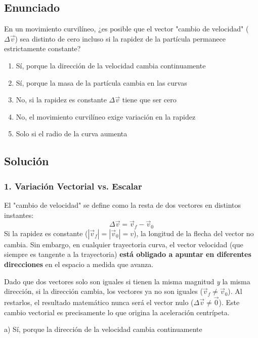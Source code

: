 \documentclass[12pt, a4paper]{article}
\begin{document}
\newpage

\subsection*{Enunciado}
En un movimiento curvilíneo, ¿es posible que el vector "cambio de velocidad" ($\Delta \vec{v}$) sea distinto de cero incluso si la rapidez de la partícula permanece estrictamente constante?
\begin{enumerate}[label=\alph*)]
    \item Sí, porque la dirección de la velocidad cambia continuamente
    \item Sí, porque la masa de la partícula cambia en las curvas
    \item No, si la rapidez es constante $\Delta \vec{v}$ tiene que ser cero
    \item No, el movimiento curvilíneo exige variación en la rapidez
    \item Solo si el radio de la curva aumenta
\end{enumerate}

\subsection*{Solución}

\subsubsection*{1. Variación Vectorial vs. Escalar}
El "cambio de velocidad" se define como la resta de dos vectores en distintos instantes:
$$ \Delta \vec{v} = \vec{v}_f - \vec{v}_0 $$
Si la rapidez es constante ($|\vec{v}_f| = |\vec{v}_0| = v$), la longitud de la flecha del vector no cambia. 
Sin embargo, en cualquier trayectoria curva, el vector velocidad (que siempre es tangente a la trayectoria) \textbf{está obligado a apuntar en diferentes direcciones} en el espacio a medida que avanza.

Dado que dos vectores solo son iguales si tienen la misma magnitud \textit{y} la misma dirección, si la dirección cambia, los vectores ya no son iguales ($\vec{v}_f \neq \vec{v}_0$). Al restarlos, el resultado matemático nunca será el vector nulo ($\Delta \vec{v} \neq \vec{0}$). Este cambio vectorial es precisamente lo que origina la aceleración centrípeta.

\begin{tcolorbox}[colback=green!5!white, colframe=green!50!black, title=Respuesta Final]
\centering \Large a) Sí, porque la dirección de la velocidad cambia continuamente
\end{tcolorbox}
\end{document}
